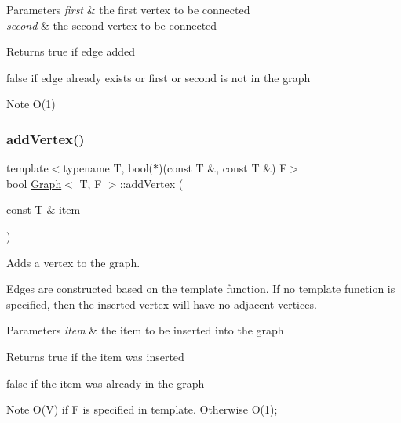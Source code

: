 \begin{DoxyParams}{Parameters}
{\em first} & the first vertex to be connected \\
\hline
{\em second} & the second vertex to be connected \\
\hline
\end{DoxyParams}
\begin{DoxyReturn}{Returns}
true if edge added 

false if edge already exists or first or second is not in the graph
\end{DoxyReturn}
\begin{DoxyNote}{Note}
O(1) 
\end{DoxyNote}
\mbox{\label{class_graph_a0d9a2a945cb00f2600f26ad63a4828d6}} 
\subsubsection{\texorpdfstring{add\+Vertex()}{addVertex()}}
{\footnotesize\ttfamily template$<$typename T, bool($\ast$)(const T \&, const T \&) F$>$ \\
bool \hyperlink{class_graph}{Graph}$<$ T, F $>$\+::add\+Vertex (\begin{DoxyParamCaption}\item[{const T \&}]{item }\end{DoxyParamCaption})}



Adds a vertex to the graph. 

Edges are constructed based on the template function. If no template function is specified, then the inserted vertex will have no adjacent vertices.


\begin{DoxyParams}{Parameters}
{\em item} & the item to be inserted into the graph \\
\hline
\end{DoxyParams}
\begin{DoxyReturn}{Returns}
true if the item was inserted 

false if the item was already in the graph
\end{DoxyReturn}
\begin{DoxyNote}{Note}
O(\+V) if F is specified in template. Otherwise O(1); 
\end{DoxyNote}
\mbox{\label{class_graph_adb8fbcba5e10315bba9e60080d4bac50}} 
